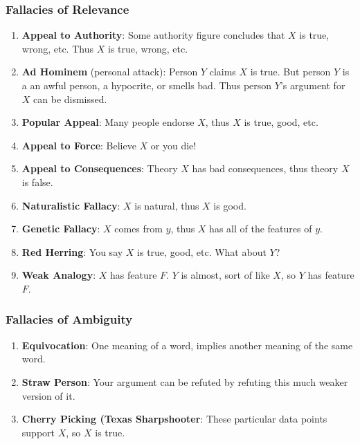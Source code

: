 \documentclass[]{article}
\newcommand{\notsowide}{\setlength{\parskip}{5mm}}
\begin{document}
\subsubsection*{Fallacies of Relevance}
\begin{enumerate}\notsowide
\item \textbf{Appeal to Authority}: Some authority figure concludes that $X$ is true, wrong, etc. Thus $X$ is true, wrong, etc.

\item \textbf{Ad Hominem} (personal attack): Person $Y$ claims $X$ is true. But person $Y$ is a an awful person, a hypocrite, or smells bad. Thus person $Y$'s argument for $X$ can be dismissed.

\item \textbf{Popular Appeal}: Many people endorse $X$, thus $X$ is true, good, etc.

\item \textbf{Appeal to Force}: Believe $X$ or you die!

\item \textbf{Appeal to Consequences}: Theory $X$ has bad consequences, thus theory $X$ is false.

\item \textbf{Naturalistic Fallacy}: $X$ is natural, thus $X$ is good.

\item \textbf{Genetic Fallacy}: $X$ comes from $y$, thus $X$ has all of the features of $y$.

\item \textbf{Red Herring}: You say $X$ is true, good, etc. What about $Y$?

\item \textbf{Weak Analogy}: $X$ has feature $F$. $Y$ is almost, sort of like $X$, so $Y$ has feature $F$. 
\end{enumerate}
\subsubsection*{Fallacies of Ambiguity}
\begin{enumerate}\notsowide
\item \textbf{Equivocation}: One meaning of a word, implies another meaning of the same word.

\item \textbf{Straw Person}: Your argument can be refuted by refuting this much weaker version of it.

\item \textbf{Cherry Picking (Texas Sharpshooter}: These particular data points support $X$, so $X$ is true.


\end{enumerate}
\end{document}
